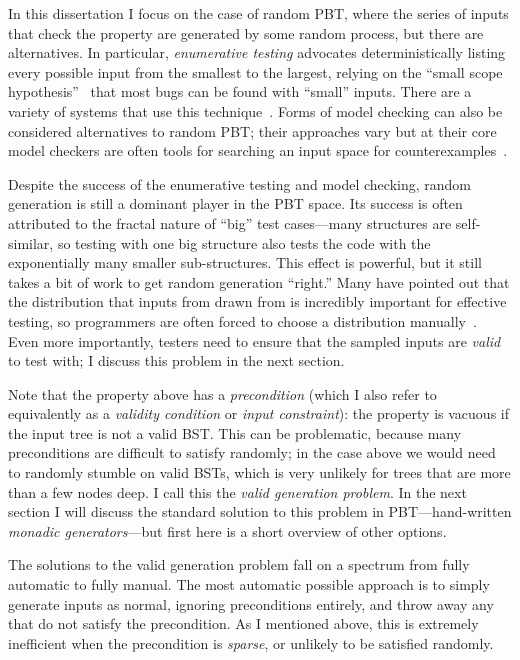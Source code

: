 In this dissertation I focus on the case of random PBT, where the series of
inputs that check the property are generated by some random process, but there
are alternatives. In particular, {\em enumerative testing} advocates
deterministically listing every possible input from the smallest to the largest,
relying on the ``small scope hypothesis''~\cite{jackson1996elements} that most
bugs can be found with ``small'' inputs. There are a variety of systems that use
this technique~\cite{DBLP:conf/haskell/RuncimanNL08,leancheck}. Forms of model
checking can also be considered alternatives to random PBT; their approaches
vary but at their core model checkers are often tools for searching an input
space for counterexamples~\cite{biere2009bounded}.

Despite the success of the enumerative testing and model checking, random
generation is still a dominant player in the PBT space. Its success is often
attributed to the fractal nature of ``big'' test cases---many structures are
self-similar, so testing with one big structure also tests the code with the
exponentially many smaller sub-structures. This effect is powerful, but it still
takes a bit of work to get random generation ``right.'' Many have pointed out
that the distribution that inputs from drawn from is incredibly important for
effective testing, so programmers are often forced to choose a distribution
manually~\cite{DBLP:conf/icfp/ClaessenH00}. Even more importantly, testers need
to ensure that the sampled inputs are {\em valid} to test with; I discuss this
problem in the next section.

%
%
Note that the property above has a {\em precondition} (which I also refer to
equivalently as a {\em validity condition} or {\em input constraint}): the
property is vacuous if the input tree is not a valid BST. This can be problematic,
because many preconditions are difficult to satisfy randomly; in the case above
we would need to randomly stumble on valid BSTs, which is very unlikely for
trees that are more than a few nodes deep. I call this the {\em valid generation
problem}. In the next section I will discuss the standard solution to this
problem in PBT---hand-written {\em monadic generators}---but first here is a
short overview of other options.

The solutions to the valid generation problem fall on a spectrum from fully
automatic to fully manual. The most automatic possible approach is to simply
generate inputs as normal, ignoring preconditions entirely, and throw away any
that do not satisfy the precondition. As I mentioned above, this is extremely
inefficient when the precondition is {\em sparse}, or unlikely to be satisfied
randomly.

